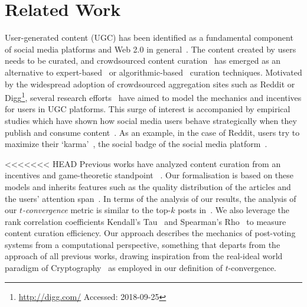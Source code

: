 \section{Related Work}
User-generated content (UGC) has been identified as a fundamental component of social media platforms and Web 2.0 in general~\cite{kaplan2010users}. The content created by users needs to be curated, and crowdsourced content curation~\cite{askalidis2013theoretical} has emerged as an alternative to expert-based~\cite{stanoevska2012content} or algorithmic-based~\cite{rader2015understanding} curation techniques. Motivated by the widespread adoption of crowdsourced aggregation sites such as Reddit or Digg\footnote{\url{http://digg.com/} Accessed: 2018-09-25}, several research efforts~\cite{das2010ranking,ghosh2011incentivizing,abbassi2014distributed} have aimed to model the mechanics and incentives for users in UGC platforms. This surge of interest is accompanied by empirical studies which have shown how
social media users behave strategically when they publish and consume content~\cite{may2014filter}. As an example, in the case of Reddit, users try to maximize their `karma'~\cite{bergstrom2011don}, the social badge of the social media platform~\cite{anderson2013steering}.

<<<<<<< HEAD
Previous works have analyzed content curation from an incentives and game-theoretic standpoint~\cite{ghosh2011incentivizing,das2010ranking,gupte2009news,may2014filter,abbassi2014distributed} . Our formalisation is based on these models and inherits features such as the quality distribution of the articles and the users' attention span~\cite{askalidis2013theoretical,ghosh2011incentivizing}. In terms of the analysis of  our results, the analysis of our \textit{$t$-convergence} metric is similar to the top-$k$ posts in~\cite{askalidis2013theoretical}. We also leverage the rank correlation coefficients Kendall's Tau~\cite{kendall1955rank} and Spearman's Rho~\cite{spearman1904proof} to measure content curation efficiency. 
Our approach describes the mechanics of post-voting systems from a computational perspective, something that departs from the approach of all previous works, drawing inspiration from the real-ideal world paradigm of Cryptography~\cite{goldreich1999foundations,lindell} as employed in our definition of $t$-convergence. 

